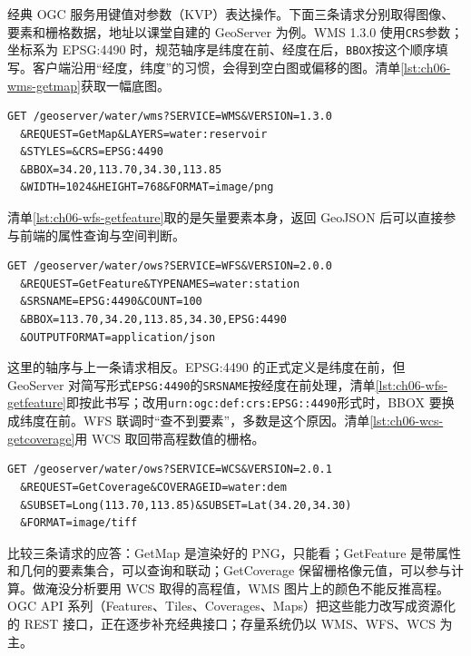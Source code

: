 经典 OGC 服务用键值对参数（KVP）表达操作。下面三条请求分别取得图像、要素和栅格数据，地址以课堂自建的 GeoServer 为例。WMS 1.3.0 使用\texttt{CRS}参数；坐标系为 EPSG:4490 时，规范轴序是纬度在前、经度在后，\texttt{BBOX}按这个顺序填写。客户端沿用“经度，纬度”的习惯，会得到空白图或偏移的图。清单\ref{lst:ch06-wms-getmap}获取一幅底图。

\begin{lstlisting}[label={lst:ch06-wms-getmap},language=HTTP,breaklines=true,caption={WMS 1.3.0 GetMap最小请求}]
GET /geoserver/water/wms?SERVICE=WMS&VERSION=1.3.0
  &REQUEST=GetMap&LAYERS=water:reservoir
  &STYLES=&CRS=EPSG:4490
  &BBOX=34.20,113.70,34.30,113.85
  &WIDTH=1024&HEIGHT=768&FORMAT=image/png
\end{lstlisting}

清单\ref{lst:ch06-wfs-getfeature}取的是矢量要素本身，返回 GeoJSON 后可以直接参与前端的属性查询与空间判断。

\begin{lstlisting}[label={lst:ch06-wfs-getfeature},language=HTTP,breaklines=true,caption={WFS GetFeature最小请求}]
GET /geoserver/water/ows?SERVICE=WFS&VERSION=2.0.0
  &REQUEST=GetFeature&TYPENAMES=water:station
  &SRSNAME=EPSG:4490&COUNT=100
  &BBOX=113.70,34.20,113.85,34.30,EPSG:4490
  &OUTPUTFORMAT=application/json
\end{lstlisting}

这里的轴序与上一条请求相反。EPSG:4490 的正式定义是纬度在前，但 GeoServer 对简写形式\texttt{EPSG:4490}的\texttt{SRSNAME}按经度在前处理，清单\ref{lst:ch06-wfs-getfeature}即按此书写；改用\texttt{urn:ogc:def:crs:EPSG::4490}形式时，BBOX 要换成纬度在前。WFS 联调时“查不到要素”，多数是这个原因。清单\ref{lst:ch06-wcs-getcoverage}用 WCS 取回带高程数值的栅格。

\begin{lstlisting}[label={lst:ch06-wcs-getcoverage},language=HTTP,breaklines=true,caption={WCS GetCoverage最小请求}]
GET /geoserver/water/ows?SERVICE=WCS&VERSION=2.0.1
  &REQUEST=GetCoverage&COVERAGEID=water:dem
  &SUBSET=Long(113.70,113.85)&SUBSET=Lat(34.20,34.30)
  &FORMAT=image/tiff
\end{lstlisting}

比较三条请求的应答：GetMap 是渲染好的 PNG，只能看；GetFeature 是带属性和几何的要素集合，可以查询和联动；GetCoverage 保留栅格像元值，可以参与计算。做淹没分析要用 WCS 取得的高程值，WMS 图片上的颜色不能反推高程。OGC API 系列（Features、Tiles、Coverages、Maps）把这些能力改写成资源化的 REST 接口，正在逐步补充经典接口；存量系统仍以 WMS、WFS、WCS 为主。

